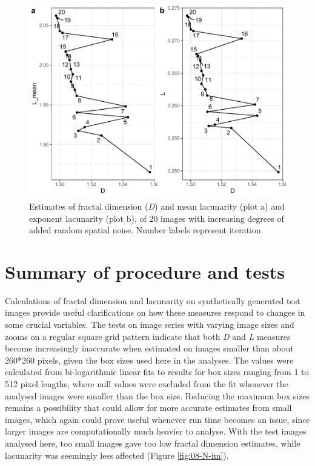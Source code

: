\documentclass[
  12pt,
]{book}
\begin{document}
\begin{figure}

{\centering \includegraphics[width=0.9\linewidth]{bookdown-demo_files/figure-latex/08-noise-1} 

}

\caption{Estimates of fractal dimension (\emph{D}) and mean lacunarity (plot a) and exponent lacunarity (plot b), of 20 images with increasing degrees of added random spatial noise. Number labels represent iteration}\label{fig:08-noise}
\end{figure}

\FloatBarrier

\hypertarget{summary-of-procedure-and-tests}{%
\section{Summary of procedure and tests}\label{summary-of-procedure-and-tests}}

Calculations of fractal dimension and lacunarity on synthetically generated test images provide useful clarifications on how these measures respond to changes in some crucial variables. The tests on image series with varying image sizes and zooms on a regular square grid pattern indicate that both \emph{D} and \emph{L} measures become increasingly inaccurate when estimated on images smaller than about 260*260 pixels, given the box sizes used here in the analyses. The values were calculated from bi-logarithmic linear fits to results for box sizes ranging from 1 to 512 pixel lengths, where null values were excluded from the fit whenever the analysed images were smaller than the box size. Reducing the maximum box sizes remains a possibility that could allow for more accurate estimates from small images, which again could prove useful whenever run time becomes an issue, since larger images are computationally much heavier to analyse. With the test images analysed here, too small images gave too low fractal dimension estimates, while lacunarity was seemingly less affected (Figure \ref{fig:08-N-im}).
\end{document}
